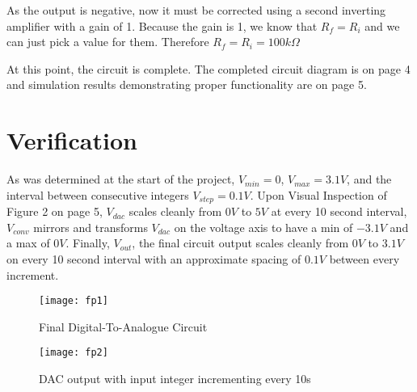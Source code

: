 \documentclass[12pt,letterpaper,titlepage]{article}
\begin{document}
\begin{raggedright}
As the output is negative, now it must be corrected using a second inverting amplifier with a gain of 1. Because the gain is 1, we know that $R_f = R_i$ and we can just pick a value for them. Therefore $R_f = R_i = 100k\Omega$

At this point, the circuit is complete. The completed circuit diagram is on page 4 and simulation results demonstrating proper functionality are on page 5.
\section*{Verification}

As was determined at the start of the project, $V_{min} = 0$, $V_{max} = 3.1V$, and the interval between consecutive integers $V_{step} = 0.1V$. Upon Visual Inspection of Figure 2 on page 5, $V_{dac}$  scales cleanly from $0V$ to $5V$ at every 10 second interval, $V_{conv}$ mirrors and transforms $V_{dac}$ on the voltage axis to have a min of $-3.1V$ and a max of $0V$. Finally, $V_{out}$, the final circuit output scales cleanly from $0V$ to $3.1V$ on every 10 second interval with an approximate spacing of $0.1V$ between every increment.

\clearpage
\begin{figure}
\begin{center}
\texttt{[image: fp1]}
\end{center}
\caption{Final Digital-To-Analogue Circuit}
\end{figure}
\clearpage
\begin{figure}
\begin{center}
\texttt{[image: fp2]}
\end{center}
\caption{DAC output with input integer incrementing every 10s}
\end{figure}

\end{raggedright}
\end{document}
